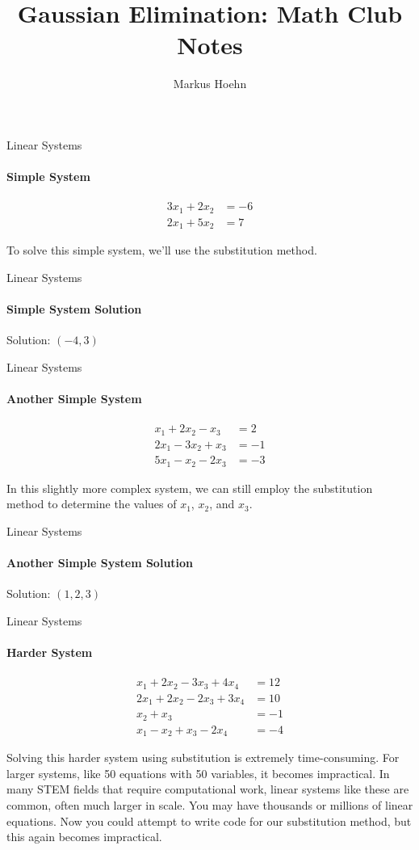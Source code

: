 \documentclass{beamer}
\title{Gaussian Elimination: Math Club Notes}
\author{Markus Hoehn}
\date{}
\begin{document}
\begin{frame}
    \titlepage
\end{frame}

\begin{frame}{Linear Systems}
\framesubtitle{Simple System}
\begin{align*}
    3x_1 + 2x_2 &= -6 \\
    2x_1 + 5x_2 &= 7
\end{align*}

To solve this simple system, we'll use the substitution method.
\end{frame}

\begin{frame}{Linear Systems}
\framesubtitle{Simple System Solution}
Solution: $(-4, 3)$
\end{frame}

\begin{frame}{Linear Systems}
\framesubtitle{Another Simple System}
\begin{align*}
    x_1 + 2x_2 - x_3 &= 2 \\
    2x_1 - 3x_2 + x_3 &= -1 \\
    5x_1 - x_2 - 2x_3 &= -3
\end{align*}

In this slightly more complex system, we can still employ the substitution method to determine the values of $x_1$, $x_2$, and $x_3$.
\end{frame}

\begin{frame}{Linear Systems}
\framesubtitle{Another Simple System Solution}
Solution: $(1, 2, 3)$
\end{frame}

\begin{frame}{Linear Systems}
\framesubtitle{Harder System}
\begin{align*}
    x_1 + 2x_2 - 3x_3 + 4x_4 &= 12 \\
    2x_1 + 2x_2 - 2x_3 + 3x_4 &= 10 \\
    x_2 + x_3 &= -1 \\
    x_1 - x_2 + x_3 - 2x_4 &= -4
\end{align*}

Solving this harder system using substitution is extremely time-consuming. For larger systems, like 50 equations with 50 variables, it becomes impractical. In many STEM fields that require computational work, linear systems like these are common, often much larger in scale. You may have thousands or millions of linear equations. Now you could attempt to write code for our substitution method, but this again becomes impractical.

\end{frame}
\end{document}
